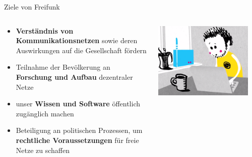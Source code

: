 \documentclass[10pt]{beamer}
\begin{document}
  \begin{frame}{Ziele von Freifunk}
    \begin{columns}[T]
     \begin{column}{5cm}
        \begin{itemize}
          \item \textbf{Verständnis von Kommunikationsnetzen} sowie deren Auswirkungen auf die Gesellschaft fördern
          \item Teilnahme der Bevölkerung an \textbf{Forschung und Aufbau} dezentraler Netze
          \item unser \textbf{Wissen und Software} öffentlich zugänglich machen
          \item Beteiligung an politischen Prozessen, um \textbf{rechtliche Voraussetzungen} für freie Netze zu schaffen
        \end{itemize}
      \end{column}
      \begin{column}{5cm}
        \includegraphics[width=0.9\textwidth]{images/install}
      \end{column}
    \end{columns}
  \end{frame}
  
\end{document}
